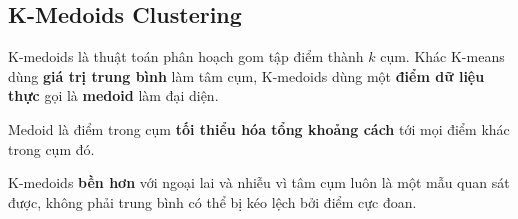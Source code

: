 \subsection{K-Medoids Clustering}

\begin{dinhnghia}[title={K-medoids}]
K-medoids là thuật toán phân hoạch gom tập điểm thành $k$ cụm. Khác K-means dùng \textbf{giá trị trung bình} làm tâm cụm, K-medoids dùng một \textbf{điểm dữ liệu thực} gọi là \textbf{medoid} làm đại diện.
\end{dinhnghia}

\begin{ynghia}[title={Medoid}]
Medoid là điểm trong cụm \textbf{tối thiểu hóa tổng khoảng cách} tới mọi điểm khác trong cụm đó.
\end{ynghia}

\begin{tinhchat}[title={So với K-means}]
K-medoids \textbf{bền hơn} với ngoại lai và nhiễu vì tâm cụm luôn là một mẫu quan sát được, không phải trung bình có thể bị kéo lệch bởi điểm cực đoan.
\end{tinhchat}
